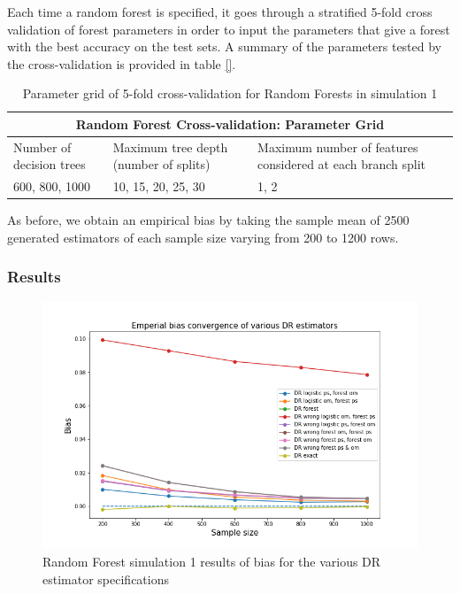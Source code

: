 \documentclass[12pt,twoside]{article}
\begin{document}
Each time a random forest is specified, it goes through a stratified 5-fold cross validation of forest parameters in order to input the parameters that give a forest with the best accuracy on the test sets. A summary of the parameters tested by the cross-validation is provided in table \ref{}.\\
\begin{table}[]
    \centering
\begin{tabular}{ |p{3cm}|p{3cm}|p{3cm}| }
 \hline
 \multicolumn{3}{|c|}{Random Forest Cross-validation: Parameter Grid} \\
 \hline
 Number of decision trees & Maximum tree depth (number of splits)  & Maximum    number of features considered at each branch split\\
 \hline
 600, 800, 1000& 10, 15, 20, 25, 30 & 1, 2 \\
 \hline 
\end{tabular}
\caption{Parameter grid of 5-fold cross-validation for Random Forests in simulation 1}
\end{table}

As before, we obtain an empirical bias by taking the sample mean of 2500 generated estimators of each sample size varying from 200 to 1200 rows. \\

\subsubsection*{Results}

\begin{figure}[h!]
    \centering
    \includegraphics[width = 0.9\columnwidth]{figures/biasRF.png}
    \caption{Random Forest simulation 1 results of bias for the various DR estimator specifications}
    \label{figbiasRF}
\end{figure}
\end{document}
